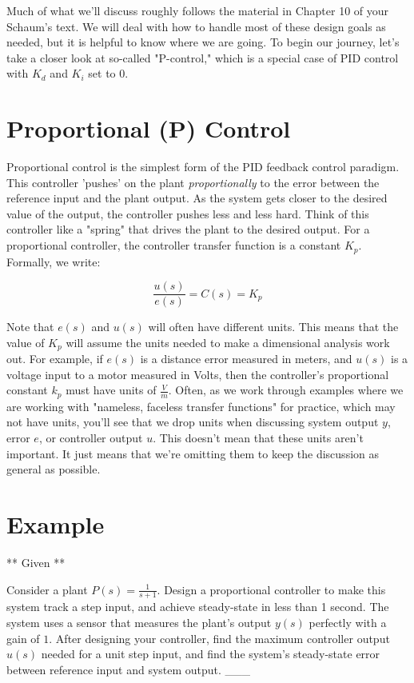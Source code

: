\documentclass[11pt]{article}
\begin{document}
Much of what we'll discuss roughly follows the material in Chapter 10 of
your Schaum's text. We will deal with how to handle most of these design
goals as needed, but it is helpful to know where we are going. To begin
our journey, let's take a closer look at so-called "P-control," which is
a special case of PID control with \(K_d\) and \(K_i\) set to 0.

    \section{Proportional (P) Control}\label{proportional-p-control}

Proportional control is the simplest form of the PID feedback control
paradigm. This controller 'pushes' on the plant \emph{proportionally} to
the error between the reference input and the plant output. As the
system gets closer to the desired value of the output, the controller
pushes less and less hard. Think of this controller like a "spring" that
drives the plant to the desired output. For a proportional controller,
the controller transfer function is a constant \(K_p\). Formally, we
write:

\begin{equation}
\frac{u(s)}{e(s)}=C(s) = K_p
\end{equation}

Note that \(e(s)\) and \(u(s)\) will often have different units. This
means that the value of \(K_p\) will assume the units needed to make a
dimensional analysis work out. For example, if \(e(s)\) is a distance
error measured in meters, and \(u(s)\) is a voltage input to a motor
measured in Volts, then the controller's proportional constant \(k_p\)
must have units of \(\frac{V}{m}\). Often, as we work through examples
where we are working with "nameless, faceless transfer functions" for
practice, which may not have units, you'll see that we drop units when
discussing system output \(y\), error \(e\), or controller output \(u\).
This doesn't mean that these units aren't important. It just means that
we're omitting them to keep the discussion as general as possible.

    \section{Example}\label{example}

** Given **

Consider a plant \(P(s) = \frac{1}{s+1}\). Design a proportional
controller to make this system track a step input, and achieve
steady-state in less than 1 second. The system uses a sensor that
measures the plant's output \(y(s)\) perfectly with a gain of \(1\).
After designing your controller, find the maximum controller output
\(u(s)\) needed for a unit step input, and find the system's
steady-state error between reference input and system output. \_\_\_
\end{document}
